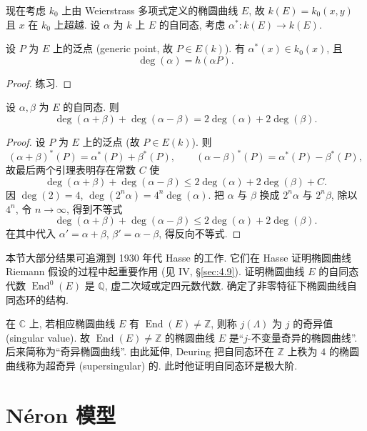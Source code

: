 现在考虑 $k_0$ 上由 Weierstrass 多项式定义的椭圆曲线 $E$, 故 $k(E) = k_0(x,y)$ 且 $x$ 在 $k_0$ 上超越. 设 $\alpha$ 为 $k$ 上 $E$ 的自同态, 考虑 $\alpha^*\colon k(E)\to k(E)$.

\begin{lemma} \label{thm:2.6.11} 
设 $P$ 为 $E$ 上的泛点 (generic point, 故 $P\in E(k)$). 有 $\alpha^*(x)\in k_0(x)$, 且
\[
\deg(\alpha) = h(\alpha P).
\]
\end{lemma}

\begin{proof}
练习.
\end{proof}

\begin{lemma} \label{thm:2.6.12} 
设 $\alpha, \beta$ 为 $E$ 的自同态. 则
\[
\deg(\alpha+\beta) + \deg(\alpha-\beta) = 2\deg(\alpha) + 2\deg(\beta).
\]
\end{lemma}

\begin{proof}
设 $P$ 为 $E$ 上的泛点 (故 $P\in E(k)$). 则
\[
(\alpha+\beta)^*(P) = \alpha^*(P) + \beta^*(P), \qquad
(\alpha-\beta)^*(P) = \alpha^*(P) - \beta^*(P),
\]
故最后两个引理表明存在常数 $C$ 使
\[
\deg(\alpha+\beta) + \deg(\alpha-\beta)\le 2\deg(\alpha) + 2\deg(\beta) + C.
\]
因 $\deg(2) = 4$, $\deg(2^n\alpha) = 4^n\deg(\alpha)$. 把 $\alpha$ 与 $\beta$ 换成 $2^n\alpha$ 与 $2^n\beta$, 除以 $4^n$, 令 $n\to\infty$, 得到不等式
\[
\deg(\alpha+\beta) + \deg(\alpha-\beta)\le 2\deg(\alpha) + 2\deg(\beta).
\]
在其中代入 $\alpha' = \alpha+\beta$, $\beta' = \alpha-\beta$, 得反向不等式.
\end{proof}

\begin{remarkstar}
本节大部分结果可追溯到 1930 年代 Hasse 的工作. 它们在 Hasse 证明椭圆曲线 Riemann 假设的过程中起重要作用 (见 IV, \S\ref{sec:4.9}). \cite{hasse1936} 证明椭圆曲线 $E$ 的自同态代数 $\operatorname{End}^0(E)$ 是 $\mathbb{Q}$, 虚二次域或定四元数代数. \cite{deuring1941} 确定了非零特征下椭圆曲线自同态环的结构.

在 $\mathbb{C}$ 上, 若相应椭圆曲线 $E$ 有 $\operatorname{End}(E)\neq\mathbb{Z}$, 则称 $j(\Lambda)$ 为 $j$ 的奇异值 (singular value). 故 $\operatorname{End}(E)\neq\mathbb{Z}$ 的椭圆曲线 $E$ 是``$j$-不变量奇异的椭圆曲线''. 后来简称为``奇异椭圆曲线''. 由此延伸, Deuring 把自同态环在 $\mathbb{Z}$ 上秩为 $4$ 的椭圆曲线称为超奇异 (supersingular) 的. 此时他证明自同态环是极大阶.
\end{remarkstar}

\section{N\'eron 模型}\label{sec:2.7}

